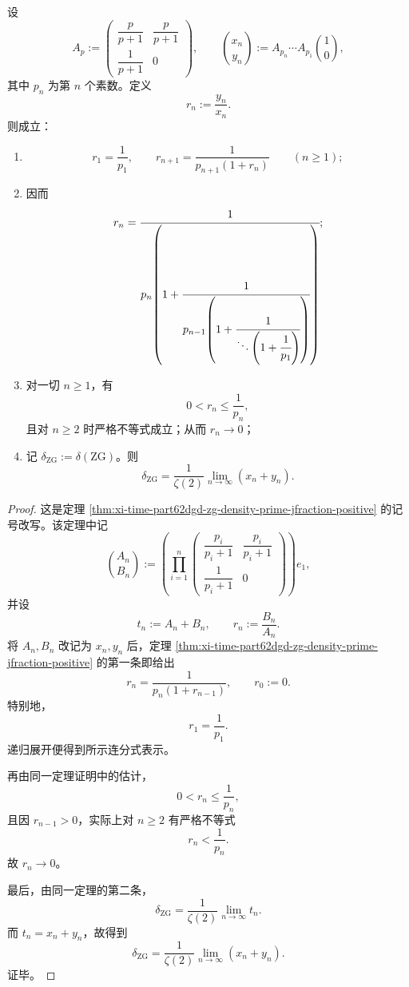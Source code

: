 \begin{theorem}\label{thm:xi-time-part9y-zg-scalar-prime-recursion}
设
\[
A_p:=
\begin{pmatrix}
\dfrac{p}{p+1} & \dfrac{p}{p+1}\\[1ex]
\dfrac{1}{p+1} & 0
\end{pmatrix},
\qquad
\binom{x_n}{y_n}:=
A_{p_n}\cdots A_{p_1}\binom10,
\]
其中 \(p_n\) 为第 \(n\) 个素数。定义
\[
r_n:=\frac{y_n}{x_n}.
\]
则成立：
\begin{enumerate}
  \item
  \[
  r_1=\frac1{p_1},
  \qquad
  r_{n+1}=\frac{1}{p_{n+1}(1+r_n)}
  \qquad (n\ge 1);
  \]
  \item 因而
  \[
  r_n=
  \cfrac{1}{p_n\!\left(1+\cfrac{1}{p_{n-1}\!\left(1+\cfrac{1}{\ddots\left(1+\cfrac1{p_1}\right)}\right)}\right)};
  \]
  \item 对一切 \(n\ge 1\)，有
  \[
  0<r_n\le \frac1{p_n},
  \]
  且对 \(n\ge 2\) 时严格不等式成立；从而 \(r_n\to 0\)；
  \item 记 \(\delta_{\mathrm{ZG}}:=\delta(\mathrm{ZG})\)。则
  \[
  \delta_{\mathrm{ZG}}=
  \frac1{\zeta(2)}
  \lim_{n\to\infty}(x_n+y_n).
  \]
\end{enumerate}
\end{theorem}
\begin{proof}
这是定理 \ref{thm:xi-time-part62dgd-zg-density-prime-jfraction-positive} 的记号改写。该定理中记
\[
\binom{A_n}{B_n}:=
\left(\prod_{i=1}^{n}
\begin{pmatrix}
\dfrac{p_i}{p_i+1} & \dfrac{p_i}{p_i+1}\\[1ex]
\dfrac{1}{p_i+1} & 0
\end{pmatrix}
\right)e_1,
\]
并设
\[
t_n:=A_n+B_n,\qquad r_n:=\frac{B_n}{A_n}.
\]
将 \(A_n,B_n\) 改记为 \(x_n,y_n\) 后，定理 \ref{thm:xi-time-part62dgd-zg-density-prime-jfraction-positive} 的第一条即给出
\[
r_n=\frac{1}{p_n(1+r_{n-1})},
\qquad
r_0:=0.
\]
特别地，
\[
r_1=\frac{1}{p_1}.
\]
递归展开便得到所示连分式表示。

再由同一定理证明中的估计，
\[
0<r_n\le \frac1{p_n},
\]
且因 \(r_{n-1}>0\)，实际上对 \(n\ge 2\) 有严格不等式
\[
r_n<\frac1{p_n}.
\]
故 \(r_n\to 0\)。

最后，由同一定理的第二条，
\[
\delta_{\mathrm{ZG}}
=
\frac1{\zeta(2)}\lim_{n\to\infty}t_n.
\]
而 \(t_n=x_n+y_n\)，故得到
\[
\delta_{\mathrm{ZG}}=
\frac1{\zeta(2)}
\lim_{n\to\infty}(x_n+y_n).
\]
证毕。
\end{proof}

